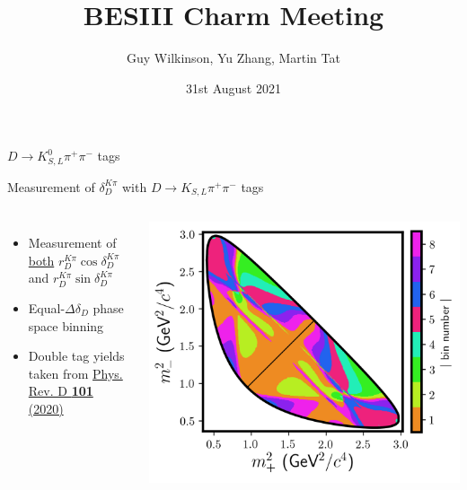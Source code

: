 \documentclass{beamer}
\title[University of Oxford]{BESIII Charm Meeting}
\author{Guy Wilkinson, Yu Zhang, Martin Tat}
\date{31st August 2021}
\begin{document}
\begin{frame}
  \titlepage
\end{frame}


\begin{frame}{$D\to K_{S, L}^0\pi^+\pi^-$ tags}
  \begin{center}
    {\huge Measurement of $\delta_D^{K\pi}$ with $D\to K_{S, L}\pi^+\pi^-$ tags}
  \end{center}
  \begin{columns}
    \begin{itemize}
      \setlength\itemsep{2em}
      \item{Measurement of \underline{both} $r_D^{K\pi}\cos\delta_D^{K\pi}$ and $r_D^{K\pi}\sin\delta_D^{K\pi}$}
      \item{Equal-$\Delta\delta_D$ phase space binning}
      \item{Double tag yields taken from \href{https://doi.org/10.1103/PhysRevD.101.112002}{Phys. Rev. D \textbf{101} (2020)}}
    \end{itemize}
    \centering
    \includegraphics[width=\textwidth]{KsPiPi_equal.png}
  \end{columns}
\end{frame}
\end{document}
